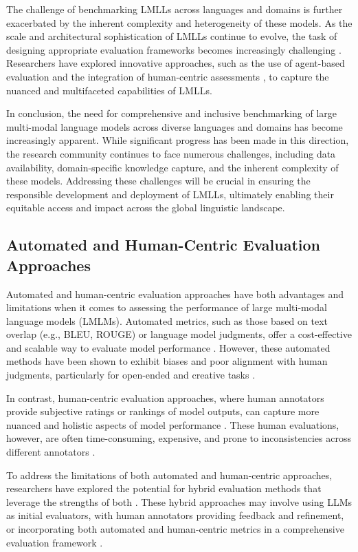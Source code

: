 \documentclass[11pt]{article}
\begin{document}
The challenge of benchmarking LMLLs across languages and domains is further exacerbated by the inherent complexity and heterogeneity of these models. As the scale and architectural sophistication of LMLLs continue to evolve, the task of designing appropriate evaluation frameworks becomes increasingly challenging \cite{ref65}. Researchers have explored innovative approaches, such as the use of agent-based evaluation \cite{ref162} and the integration of human-centric assessments \cite{ref163}, to capture the nuanced and multifaceted capabilities of LMLLs.

In conclusion, the need for comprehensive and inclusive benchmarking of large multi-modal language models across diverse languages and domains has become increasingly apparent. While significant progress has been made in this direction, the research community continues to face numerous challenges, including data availability, domain-specific knowledge capture, and the inherent complexity of these models. Addressing these challenges will be crucial in ensuring the responsible development and deployment of LMLLs, ultimately enabling their equitable access and impact across the global linguistic landscape.

\subsection{Automated and Human-Centric Evaluation Approaches}

Automated and human-centric evaluation approaches have both advantages and limitations when it comes to assessing the performance of large multi-modal language models (LMLMs). Automated metrics, such as those based on text overlap (e.g., BLEU, ROUGE) or language model judgments, offer a cost-effective and scalable way to evaluate model performance \cite{ref60}. However, these automated methods have been shown to exhibit biases and poor alignment with human judgments, particularly for open-ended and creative tasks \cite{ref149,ref164}.

In contrast, human-centric evaluation approaches, where human annotators provide subjective ratings or rankings of model outputs, can capture more nuanced and holistic aspects of model performance \cite{ref165}. These human evaluations, however, are often time-consuming, expensive, and prone to inconsistencies across different annotators \cite{ref166}.

To address the limitations of both automated and human-centric approaches, researchers have explored the potential for hybrid evaluation methods that leverage the strengths of both \cite{ref167,ref168}. These hybrid approaches may involve using LLMs as initial evaluators, with human annotators providing feedback and refinement, or incorporating both automated and human-centric metrics in a comprehensive evaluation framework \cite{ref169}.
\end{document}
